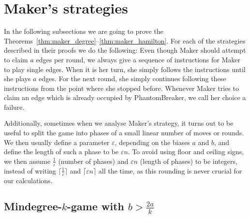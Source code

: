 \documentclass[11pt, a4paper]{article}
\numberwithin{equation}{section}
\numberwithin{figure}{section}
\newcommand{\eps}{\varepsilon}
\begin{document}
\bigskip


\section{Maker's strategies}
\label{sec:maker.strategies}

In the following subsections we are going to prove
the Theorems~\ref{thm:maker_degree}--\ref{thm:maker_hamilton}.
For each of the strategies described in their proofs
we do the following: 
Even though Maker should attempt to claim $a$ edges per round, 
we always give a sequence of instructions for Maker to play single edges. When it is her turn, she simply follows the instructions until she plays $a$ edges. For the next round, she simply continues
following these instructions from the point where she stopped before.
Whenever Maker tries to claim an edge which is already occupied by PhantomBreaker, we call her choice a failure.

Additionally, sometimes when we analyse Maker's strategy, it turns out to be useful to split the 
game into phases of a small linear number of moves or rounds. We then usually define a parameter $\varepsilon$,
depending on the biases $a$ and $b$,
and define the length of such a phase to be $\varepsilon n$. To avoid
using floor and ceiling signs,
we then assume $\frac {1}{\eps}$ (number of phases) and $\eps n$ (length of phases) to be integers, instead of writing 
$\lceil \frac{1}{\eps} \rceil$ and $\lceil \eps n \rceil$
all the time, as this rounding is never crucial for our calculations. 










\subsection{Mindegree-$k$-game with $b> \frac{2a}{k}$}
\end{document}
